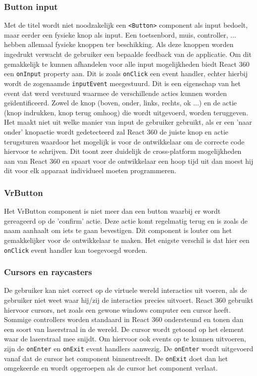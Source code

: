 \subsubsection{Button input}
Met de titel wordt niet noodzakelijk een \lstinline[basicstyle=\ttfamily\color{red}]|<Button>| component als input bedoelt, maar eerder een fysieke knop als input. Een toetsenbord, muis, controller, ... hebben allemaal fysieke knoppen ter beschikking. Als deze knoppen worden ingedrukt verwacht de gebruiker een bepaalde feedback van de applicatie. Om dit gemakkelijk te kunnen afhandelen voor alle input mogelijkheden biedt React 360 een \lstinline[basicstyle=\ttfamily\color{red}]|onInput| property aan. Dit is zoals \lstinline[basicstyle=\ttfamily\color{red}]|onClick| een event handler, echter hierbij wordt de zogenaamde \lstinline[basicstyle=\ttfamily\color{red}]|inputEvent| meegestuurd. Dit is een eigenschap van het event dat werd verstuurd waarmee de verschillende acties kunnen worden geïdentificeerd. Zowel de knop (boven, onder, links, rechts, ok ...) en de actie (knop indrukken, knop terug omhoog) die wordt uitgevoerd, worden teruggeven. Het maakt niet uit welke manier van input de gebruiker gebruikt, als er een 'naar onder' knopactie wordt gedetecteerd zal React 360 de juiste knop en actie terugsturen waardoor het  mogelijk is voor de ontwikkelaar om de correcte code hiervoor te schrijven. Dit toont zeer duidelijk de cross-platform mogelijkheden aan van React 360 en spaart voor de ontwikkelaar een hoop tijd uit dan moest hij dit voor elk apparaat individueel moeten programmeren.

\subsubsection{VrButton}
Het VrButton component is niet meer dan een button waarbij er wordt gereageerd op de 'confirm' actie. Deze actie komt regelmatig terug en is zoals de naam aanhaalt om iets te gaan bevestigen. Dit component is louter om het gemakkelijker voor de ontwikkelaar te maken. Het enigste verschil is dat hier een \lstinline[basicstyle=\ttfamily\color{red}]|onClick| event handler kan toegevoegd worden.

\subsubsection{Cursors en raycasters}
De gebruiker kan niet correct op de virtuele wereld interacties uit voeren, als de gebruiker niet weet waar hij/zij de interacties precies uitvoert. React 360 gebruikt hiervoor cursors, net zoals een gewone windows computer een cursor heeft. Sommige controllers worden standaard in React 360 ondersteund en tonen dan een soort van laserstraal in de wereld. De cursor wordt getoond op het element waar de laserstraal mee snijdt. Om hiervoor ook events op te kunnen uitvoeren, zijn de \lstinline[basicstyle=\ttfamily\color{red}]|onEnter| en \lstinline[basicstyle=\ttfamily\color{red}]|onExit| event handlers aanwezig. De \lstinline[basicstyle=\ttfamily\color{red}]|onEnter| wordt uitgevoerd vanaf dat de cursor het component binnentreedt. De \lstinline[basicstyle=\ttfamily\color{red}]|onExit| doet dan het omgekeerde en wordt opgeroepen als de cursor het component verlaat.

